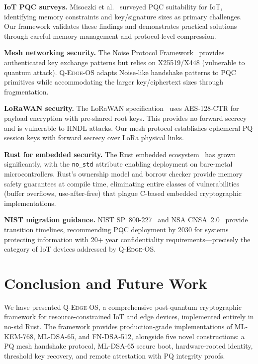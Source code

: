 \documentclass[conference,10pt]{IEEEtran}
\newcommand{\system}{\textsc{Q-Edge-OS}}
\begin{document}
\textbf{IoT PQC surveys.} Misoczki et al.~\cite{iot_pqc_survey} surveyed PQC suitability for IoT, identifying memory constraints and key/signature sizes as primary challenges. Our framework validates these findings and demonstrates practical solutions through careful memory management and protocol-level compression.

\textbf{Mesh networking security.} The Noise Protocol Framework~\cite{noise_perrin} provides authenticated key exchange patterns but relies on X25519/X448 (vulnerable to quantum attack). \system{} adapts Noise-like handshake patterns to PQC primitives while accommodating the larger key/ciphertext sizes through fragmentation.

\textbf{LoRaWAN security.} The LoRaWAN specification~\cite{lora_alliance} uses AES-128-CTR for payload encryption with pre-shared root keys. This provides no forward secrecy and is vulnerable to HNDL attacks. Our mesh protocol establishes ephemeral PQ session keys with forward secrecy over LoRa physical links.

\textbf{Rust for embedded security.} The Rust embedded ecosystem~\cite{rust_embedded} has grown significantly, with the \texttt{no\_std} attribute enabling deployment on bare-metal microcontrollers. Rust's ownership model and borrow checker provide memory safety guarantees at compile time, eliminating entire classes of vulnerabilities (buffer overflows, use-after-free) that plague C-based embedded cryptographic implementations.

\textbf{NIST migration guidance.} NIST SP~800-227~\cite{sp800227} and NSA CNSA~2.0~\cite{cnsa2} provide transition timelines, recommending PQC deployment by 2030 for systems protecting information with 20+ year confidentiality requirements---precisely the category of IoT devices addressed by \system{}.

\section{Conclusion and Future Work}
\label{sec:conclusion}

We have presented \system{}, a comprehensive post-quantum cryptographic framework for resource-constrained IoT and edge devices, implemented entirely in no-std Rust. The framework provides production-grade implementations of ML-KEM-768, ML-DSA-65, and FN-DSA-512, alongside five novel constructions: a PQ mesh handshake protocol, ML-DSA-65 secure boot, hardware-rooted identity, threshold key recovery, and remote attestation with PQ integrity proofs.
\end{document}
